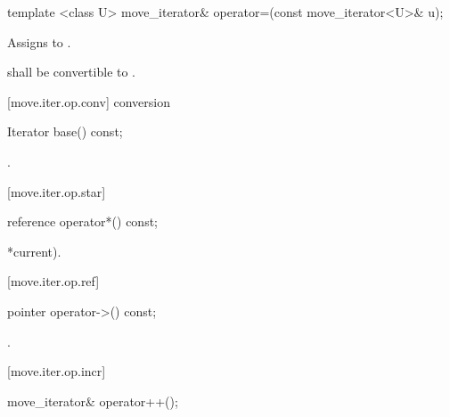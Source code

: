 %
%
\begin{itemdecl}
template <class U> move_iterator& operator=(const move_iterator<U>& u);
\end{itemdecl}

\begin{itemdescr}
\pnum
\effects Assigns  to
.

\pnum
\requires {} shall be convertible to
.
\end{itemdescr}

[move.iter.op.conv]{ conversion}

%
%
\begin{itemdecl}
Iterator base() const;
\end{itemdecl}

\begin{itemdescr}
\pnum
\returns {}.
\end{itemdescr}

[move.iter.op.star]{}

%
%
\begin{itemdecl}
reference operator*() const;
\end{itemdecl}

\begin{itemdescr}
\pnum
\returns {}*current).
\end{itemdescr}

[move.iter.op.ref]{}

%
%
\begin{itemdecl}
pointer operator->() const;
\end{itemdecl}

\begin{itemdescr}
\pnum
\returns {}.
\end{itemdescr}

[move.iter.op.incr]{}

%
%
\begin{itemdecl}
move_iterator& operator++();
\end{itemdecl}

